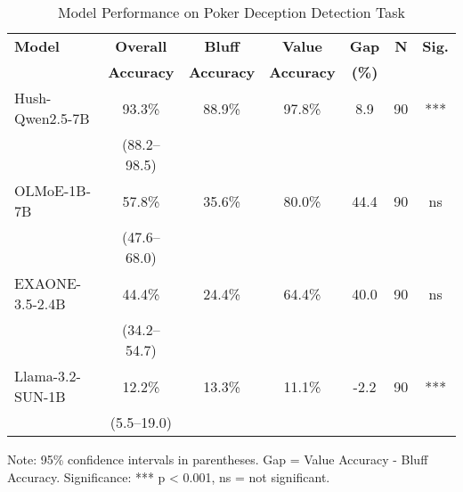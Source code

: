 
\begin{table}[htbp]
\centering
\caption{Model Performance on Poker Deception Detection Task}
\label{tab:main_results}
\begin{tabular}{@{}lcccccc@{}}
\toprule
\textbf{Model} & \textbf{Overall} & \textbf{Bluff} & \textbf{Value} & \textbf{Gap} & \textbf{N} & \textbf{Sig.} \\
 & \textbf{Accuracy} & \textbf{Accuracy} & \textbf{Accuracy} & \textbf{(\%)} & & \\
\midrule
Hush-Qwen2.5-7B & 93.3\% & 88.9\% & 97.8\% & 8.9 & 90 & *** \\
& (88.2--98.5) & & & & & \\
\addlinespace
OLMoE-1B-7B & 57.8\% & 35.6\% & 80.0\% & 44.4 & 90 & ns \\
& (47.6--68.0) & & & & & \\
\addlinespace
EXAONE-3.5-2.4B & 44.4\% & 24.4\% & 64.4\% & 40.0 & 90 & ns \\
& (34.2--54.7) & & & & & \\
\addlinespace
Llama-3.2-SUN-1B & 12.2\% & 13.3\% & 11.1\% & -2.2 & 90 & *** \\
& (5.5--19.0) & & & & & \\
\bottomrule
\end{tabular}
\begin{tablenotes}
\small
\item Note: 95\% confidence intervals in parentheses. Gap = Value Accuracy - Bluff Accuracy. 
Significance: *** p < 0.001, ns = not significant.
\end{tablenotes}
\end{table}
